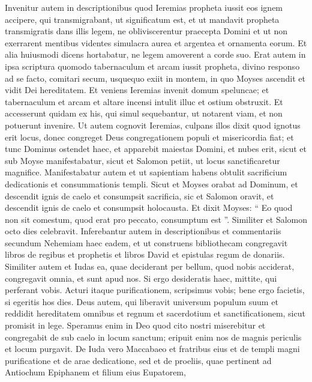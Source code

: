 \begin{biblechapter}
\begin{biblechapter}
\verse Invenitur autem in descriptionibus quod Ieremias propheta iussit eos ignem accipere, qui transmigrabant, ut significatum est, 
\verse et ut mandavit propheta transmigratis dans illis legem, ne obliviscerentur praecepta Domini et ut non exerrarent mentibus videntes simulacra aurea et argentea et ornamenta eorum. 
\verse Et alia huiusmodi dicens hortabatur, ne legem amoverent a corde suo. 
\verse Erat autem in ipsa scriptura quomodo tabernaculum et arcam iussit propheta, divino responso ad se facto, comitari secum, usquequo exiit in montem, in quo Moyses ascendit et vidit Dei hereditatem. 
\verse Et veniens Ieremias invenit domum speluncae; et tabernaculum et arcam et altare incensi intulit illuc et ostium obstruxit. 
\verse Et accesserunt quidam ex his, qui simul sequebantur, ut notarent viam, et non potuerunt invenire. 
\verse Ut autem cognovit Ieremias, culpans illos dixit quod ignotus erit locus, donec congreget Deus congregationem populi et misericordia fiat; 
\verse et tunc Dominus ostendet haec, et apparebit maiestas Domini, et nubes erit, sicut et sub Moyse manifestabatur, sicut et Salomon petiit, ut locus sanctificaretur magnifice. 
 \verse Manifestabatur autem et ut sapientiam habens obtulit sacrificium dedicationis et consummationis templi. 
\verse Sicut et Moyses orabat ad Dominum, et descendit ignis de caelo et consumpsit sacrificia, sic et Salomon oravit, et descendit ignis de caelo et consumpsit holocausta. 
\verse Et dixit Moyses: “ Eo quod non sit comestum, quod erat pro peccato, consumptum est ”. 
\verse Similiter et Salomon octo dies celebravit.
 \verse Inferebantur autem in descriptionibus et commentariis secundum Nehemiam haec eadem, et ut construens bibliothecam congregavit libros de regibus et prophetis et libros David et epistulas regum de donariis. 
\verse Similiter autem et Iudas ea, quae deciderant per bellum, quod nobis acciderat, congregavit omnia, et sunt apud nos. 
\verse Si ergo desideratis haec, mittite, qui perferant vobis.
 \verse Acturi itaque purificationem, scripsimus vobis; bene ergo facietis, si egeritis hos dies. 
\verse Deus autem, qui liberavit universum populum suum et reddidit hereditatem omnibus et regnum et sacerdotium et sanctificationem, 
 \verse sicut promisit in lege. Speramus enim in Deo quod cito nostri miserebitur et congregabit de sub caelo in locum sanctum; eripuit enim nos de magnis periculis et locum purgavit.
 \verse De Iuda vero Maccabaeo et fratribus eius et de templi magni purificatione et de arae dedicatione, 
\verse sed et de proeliis, quae pertinent ad Antiochum Epiphanem et filium eius Eupatorem, 

\end{biblechapter}
\end{biblechapter}
